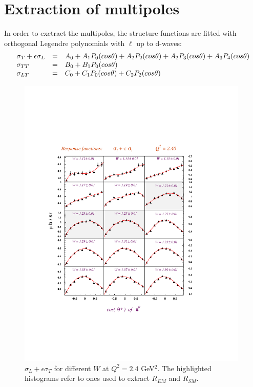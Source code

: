 \section{Extraction of multipoles}
In order to exctract the multipoles, the structure functions are fitted
with orthogonal Legendre polynomials with $\ell$ up to d-waves:
$$
\begin{array}{l c l}
\sigma_T + \epsilon\sigma_L & = & A_0 + A_1P_0(cos\theta) + A_2P_2(cos\theta) + A_2P_3(cos\theta) + A_3P_4(cos\theta)\\
\sigma_{TT}                 & = & B_0 + B_1P_0(cos\theta) \\
\sigma_{LT}                 & = & C_0 + C_1P_0(cos\theta) + C_2P_2(cos\theta) \\
\end{array}
$$




\begin{figure}[h]
 \includegraphics[width = 11cm, bb=60 110 400 640]{analysis/img/Sigma_lpt_Q2_2.40}
  \caption[$\sigma_L + \epsilon\sigma_T$ for different $W$ at $Q^2 = 2.4$ GeV$^2$]
          { $\sigma_L + \epsilon\sigma_T$ for different $W$ at $Q^2 = 2.4$ GeV$^2$. 
	             The highlighted histograms refer to ones used to extract $R_{EM}$ and $R_{SM}$.}
 \label{fig:Sigma_lpt_Q2_2.40}

\end{figure}















